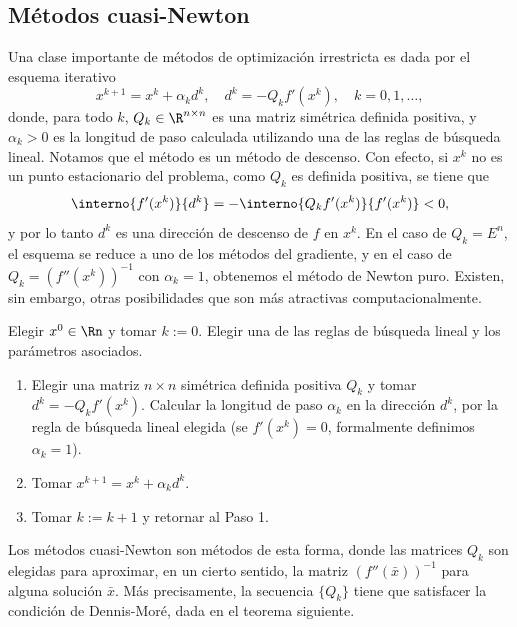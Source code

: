 
\subsection{Métodos cuasi-Newton}

Una clase importante de métodos de optimización irrestricta es dada por el esquema iterativo
\begin{equation}
    x^{k+1} = x^k + \alpha_k d^k, \quad d^k = -Q_k f'(x^k), \quad k = 0, 1, \dots,
    \label{eq:cuasi_newton_esquema}
\end{equation}
donde, para todo $k$, $Q_k \in \R^{n \times n}$ es una matriz simétrica definida positiva, y $\alpha_k > 0$ es la longitud de paso calculada utilizando una de las reglas de búsqueda lineal. Notamos que el método es un método de descenso. Con efecto, si $x^k$ no es un punto estacionario del problema, como $Q_k$ es definida positiva, se tiene que
\begin{equation}
    \interno{f'(x^k)}{d^k} = -\interno{Q_k f'(x^k)}{f'(x^k)} < 0,
\end{equation}
y por lo tanto $d^k$ es una dirección de descenso de $f$ en $x^k$. En el caso de $Q_k = E^n$, el esquema se reduce a uno de los métodos del gradiente, y en el caso de $Q_k = (f''(x^k))^{-1}$ con $\alpha_k = 1$, obtenemos el método de Newton puro. Existen, sin embargo, otras posibilidades que son más atractivas computacionalmente.

\begin{algorithm}
    Elegir $x^0 \in \Rn$ y tomar $k := 0$. Elegir una de las reglas de búsqueda lineal y los parámetros asociados.
    \begin{enumerate}
        \item Elegir una matriz $n \times n$ simétrica definida positiva $Q_k$ y tomar $d^k = -Q_k f'(x^k)$. Calcular la longitud de paso $\alpha_k$ en la dirección $d^k$, por la regla de búsqueda lineal elegida (se $f'(x^k) = 0$, formalmente definimos $\alpha_k = 1$).
        \item Tomar $x^{k+1} = x^k + \alpha_k d^k$.
        \item Tomar $k := k + 1$ y retornar al Paso 1.
    \end{enumerate}
\end{algorithm}

Los métodos cuasi-Newton son métodos de esta forma, donde las matrices $Q_k$ son elegidas para aproximar, en un cierto sentido, la matriz $(f''(\bar{x}))^{-1}$ para alguna solución $\bar{x}$. Más precisamente, la secuencia $\{Q_k\}$ tiene que satisfacer la condición de Dennis-Moré, dada en el teorema siguiente.

